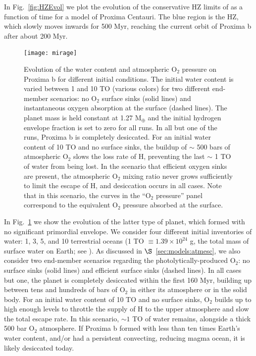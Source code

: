 \documentclass[preprint,12pt]{aastex}
\begin{document}
In Fig.~\ref{fig:HZEvol} we plot the evolution of the conservative HZ limits of \cite{Kopparapu13} as a function of time for a model of Proxima Centauri. The blue region is the HZ, which slowly moves inwards for 500 Myr, reaching the current orbit of Proxima b after about 200 Myr.

\begin{figure}[ht]
\centering
\texttt{[image: mirage]}
\caption{Evolution of the water content and atmospheric O$_2$ pressure
  on Proxima b for different initial conditions. The initial water
  content is varied between 1 and 10 TO (various colors) for two
  different end-member scenarios: no O$_2$ surface sinks (solid lines)
  and instantaneous oxygen absorption at the surface (dashed
  lines). The planet mass is held constant at 1.27 M$_\oplus$ and the
  initial hydrogen envelope fraction is set to zero for all runs. In
  all but one of the runs, Proxima b is completely desiccated. For an
  initial water content of 10 TO and no surface sinks, the buildup of
  $\sim$ 500 bars of atmospheric O$_2$ slows the loss rate of H,
  preventing the last $\sim$ 1 TO of water from being lost. In the
  scenario that efficient oxygen sinks are present, the atmospheric
  O$_2$ mixing ratio never grows sufficiently to limit the escape of
  H, and desiccation occurs in all cases. Note that in this scenario,
  the curves in the ``O$_2$ pressure'' panel correspond to the
  equivalent O$_2$ pressure absorbed at the surface.}
\label{fig:atmesc:mirage}
\end{figure}

In Fig.~\ref{fig:atmesc:mirage} we show the evolution of the latter
type of planet, which formed with no significant primordial
envelope. We consider four different initial inventories of water: 1,
3, 5, and 10 terrestrial oceans (1 TO $\equiv 1.39\times 10^{24}$ g,
the total mass of surface water on Earth; see \cite{Kasting88}). As
discussed in $\S$~\ref{sec:models:atmesc}, we also consider two end-member
scenarios regarding the photolytically-produced O$_2$: no surface
sinks (solid lines) and efficient surface sinks (dashed lines). In all
cases but one, the planet is completely desiccated within the first
160 Myr, building up between tens and hundreds of bars of O$_2$ in
either its atmosphere or in the solid body. For an initial water
content of 10 TO and no surface sinks, O$_2$ builds up to high enough
levels to throttle the supply of H to the upper atmosphere and slow
the total escape rate. In this scenario, $\sim 1$ TO of water remains,
alongside a thick 500 bar O$_2$ atmosphere. If Proxima b formed with
less than ten times Earth's water content, and/or had a persistent
convecting, reducing magma ocean, it is likely desiccated today.
\end{document}
